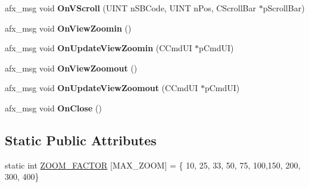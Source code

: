 \begin{DoxyCompactItemize}
\item 
\mbox{\label{class_basic_view_aa15ef76fc3123761dabf6c26d2079a44}} 
afx\+\_\+msg void {\bfseries On\+V\+Scroll} (U\+I\+NT n\+S\+B\+Code, U\+I\+NT n\+Pos, C\+Scroll\+Bar $\ast$p\+Scroll\+Bar)
\item 
\mbox{\label{class_basic_view_a80315db783abe2477eda76b66750b571}} 
afx\+\_\+msg void {\bfseries On\+View\+Zoomin} ()
\item 
\mbox{\label{class_basic_view_abdf4441d048617debebd65959130c4ea}} 
afx\+\_\+msg void {\bfseries On\+Update\+View\+Zoomin} (C\+Cmd\+UI $\ast$p\+Cmd\+UI)
\item 
\mbox{\label{class_basic_view_a6683be2d4eaf00df6bf3c865de183719}} 
afx\+\_\+msg void {\bfseries On\+View\+Zoomout} ()
\item 
\mbox{\label{class_basic_view_a8413f54e94417ffd14feb39687c02e3a}} 
afx\+\_\+msg void {\bfseries On\+Update\+View\+Zoomout} (C\+Cmd\+UI $\ast$p\+Cmd\+UI)
\item 
\mbox{\label{class_basic_view_a7e588e703875860f0c83de89c1256b9f}} 
afx\+\_\+msg void {\bfseries On\+Close} ()
\end{DoxyCompactItemize}
\subsection*{Static Public Attributes}
\begin{DoxyCompactItemize}
\item 
static int \mbox{\hyperlink{class_basic_view_ad66db924d3a8a6937720a656336825a7}{Z\+O\+O\+M\+\_\+\+F\+A\+C\+T\+OR}} \mbox{[}M\+A\+X\+\_\+\+Z\+O\+OM\mbox{]} = \{ 10, 25, 33, 50, 75, 100,150, 200, 300, 400\}
\end{DoxyCompactItemize}
